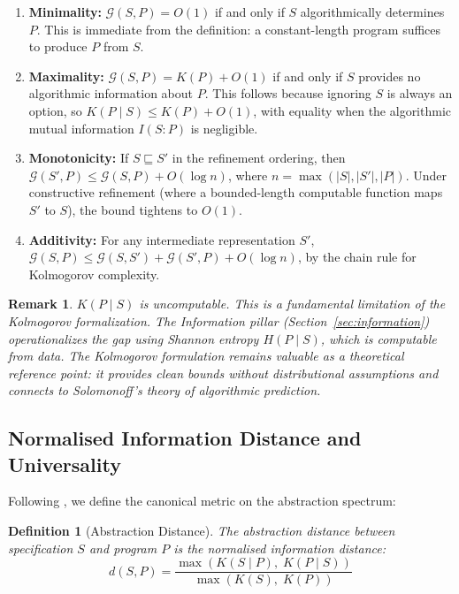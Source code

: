 \documentclass[11pt, a4paper]{googledeepmind}
\newtheorem{definition}{Definition}[section]
\newtheorem*{remark}{Remark}
\begin{document}
\begin{enumerate}[label=(\alph*)]
    \item \textbf{Minimality:} $\mathcal{G}(S, P) = O(1)$ if and only if $S$ algorithmically determines $P$. This is immediate from the definition: a constant-length program suffices to produce $P$ from $S$.
    \item \textbf{Maximality:} $\mathcal{G}(S, P) = K(P) + O(1)$ if and only if $S$ provides no algorithmic information about $P$. This follows because ignoring $S$ is always an option, so $K(P \mid S) \leq K(P) + O(1)$, with equality when the algorithmic mutual information $I(S : P)$ is negligible.
    \item \textbf{Monotonicity:} If $S \sqsubseteq S'$ in the refinement ordering, then $\mathcal{G}(S', P) \leq \mathcal{G}(S, P) + O(\log n)$, where $n = \max(|S|, |S'|, |P|)$. Under constructive refinement (where a bounded-length computable function maps $S'$ to $S$), the bound tightens to $O(1)$.
    \item \textbf{Additivity:} For any intermediate representation $S'$, $\mathcal{G}(S, P) \leq \mathcal{G}(S, S') + \mathcal{G}(S', P) + O(\log n)$, by the chain rule for Kolmogorov complexity.
\end{enumerate}

\begin{remark}
$K(P \mid S)$ is uncomputable. This is a fundamental limitation of the Kolmogorov formalization. The Information pillar (Section~\ref{sec:information}) operationalizes the gap using Shannon entropy $H(P \mid S)$, which is computable from data. The Kolmogorov formulation remains valuable as a theoretical reference point: it provides clean bounds without distributional assumptions and connects to Solomonoff's theory of algorithmic prediction.
\end{remark}

\subsection{Normalised Information Distance and Universality}

Following \citet{li2004similarity}, we define the canonical metric on the abstraction spectrum:

\begin{definition}[Abstraction Distance]
The \emph{abstraction distance} between specification $S$ and program $P$ is the normalised information distance:
\begin{equation}
    d(S, P) = \frac{\max(K(S \mid P),\; K(P \mid S))}{\max(K(S),\; K(P))}
\end{equation}
\end{definition}
\end{document}
